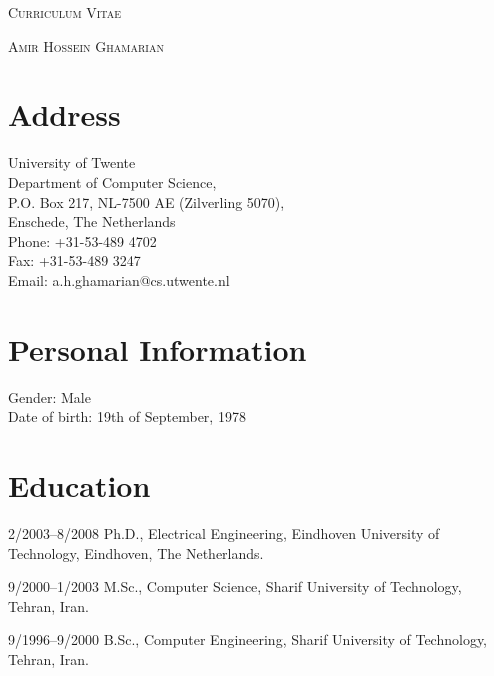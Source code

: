 \documentclass[a4paper]{article}
\begin{document}
\pagestyle{empty}

\begin{center}
\huge{\textsc{Curriculum Vitae}}
\vspace{\baselineskip}

\Large{\textsc{Amir Hossein Ghamarian}}
\end{center}
\vspace{1.5\baselineskip}

\section{Address}

\begin{flushleft}
  University of Twente \\
  Department of Computer Science, \\
  P.O. Box 217, NL-7500 AE (Zilverling 5070), \\
  Enschede, The Netherlands \\
  Phone: +31-53-489 4702 \\
  Fax: +31-53-489 3247 \\
  Email: a.h.ghamarian@cs.utwente.nl \\
\end{flushleft}

\section{Personal Information}
\begin{flushleft}
  Gender: Male \\
  Date of birth: 19th of September, 1978 \\
\end{flushleft}


\section{Education}
\begin{CV}
\item[2/2003--8/2008] Ph.D., Electrical Engineering, Eindhoven
University of Technology, Eindhoven, The Netherlands.

\item[9/2000--1/2003] M.Sc., Computer Science, Sharif University of Technology, Tehran, Iran.

\item[9/1996--9/2000] B.Sc., Computer Engineering, Sharif University
of Technology, Tehran, Iran.

\end{CV}
\pagebreak
\end{document}
